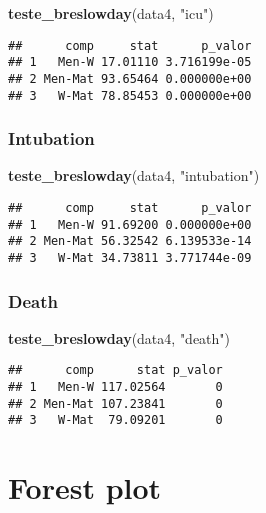 \documentclass[
]{article}
\newenvironment{Shaded}{\begin{snugshade}}{\end{snugshade}}
\newcommand{\KeywordTok}[1]{\textcolor[rgb]{0.13,0.29,0.53}{\textbf{#1}}}
\newcommand{\NormalTok}[1]{#1}
\newcommand{\StringTok}[1]{\textcolor[rgb]{0.31,0.60,0.02}{#1}}
\begin{document}
\begin{Shaded}
\begin{Highlighting}[]
\KeywordTok{teste_breslowday}\NormalTok{(data4, }\StringTok{"icu"}\NormalTok{)}
\end{Highlighting}
\end{Shaded}

\begin{verbatim}
##      comp     stat      p_valor
## 1   Men-W 17.01110 3.716199e-05
## 2 Men-Mat 93.65464 0.000000e+00
## 3   W-Mat 78.85453 0.000000e+00
\end{verbatim}

\hypertarget{intubation-3}{%
\subsubsection{Intubation}\label{intubation-3}}

\begin{Shaded}
\begin{Highlighting}[]
\KeywordTok{teste_breslowday}\NormalTok{(data4, }\StringTok{"intubation"}\NormalTok{)}
\end{Highlighting}
\end{Shaded}

\begin{verbatim}
##      comp     stat      p_valor
## 1   Men-W 91.69200 0.000000e+00
## 2 Men-Mat 56.32542 6.139533e-14
## 3   W-Mat 34.73811 3.771744e-09
\end{verbatim}

\hypertarget{death-3}{%
\subsubsection{Death}\label{death-3}}

\begin{Shaded}
\begin{Highlighting}[]
\KeywordTok{teste_breslowday}\NormalTok{(data4, }\StringTok{"death"}\NormalTok{)}
\end{Highlighting}
\end{Shaded}

\begin{verbatim}
##      comp      stat p_valor
## 1   Men-W 117.02564       0
## 2 Men-Mat 107.23841       0
## 3   W-Mat  79.09201       0
\end{verbatim}

\hypertarget{forest-plot}{%
\section{Forest plot}\label{forest-plot}}
\end{document}

